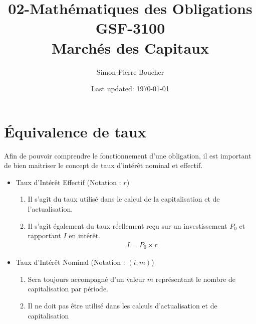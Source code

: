 \documentclass[letterpaper, 12pt]{article}
\newcommand{\1}{\mathds{1}}	%
\theoremstyle{definition}
\begin{document}

\title{02-Mathématiques des Obligations \\[1em]
\normalsize GSF-3100 \\ Marchés des Capitaux}


\author{\normalsize Simon-Pierre Boucher}
\date{\normalsize\vspace{-1ex} Last updated: \today}


\maketitle
\tableofcontents\label{sec:contents}


\newpage

\section{Équivalence de taux}
Afin de pouvoir comprendre le fonctionnement d'une obligation, il est important de bien maitriser le concept de taux d'intérêt nominal et effectif.

\begin{itemize}
\item Taux d'Intérêt Effectif (Notation : $r$)
\begin{enumerate}
\item Il s'agit du taux utilisé dans le calcul de la capitalisation et de l'actualisation. 
\item Il s'agit également du taux réellement reçu sur un investissement $P_0$ et rapportant $I$ en intérêt.
\begin{align*}
I=P_0 \times r
\end{align*}
\end{enumerate}
\item Taux d'Intérêt Nominal (Notation : $(i;m)$)
\begin{enumerate}
\item Sera toujours accompagné d'un valeur $m$ représentant le nombre de capitalisation par période.
\item Il ne doit pas être utilisé dans les calculs d’actualisation et de capitalisation
\end{enumerate}
\end{itemize}
\end{document}
